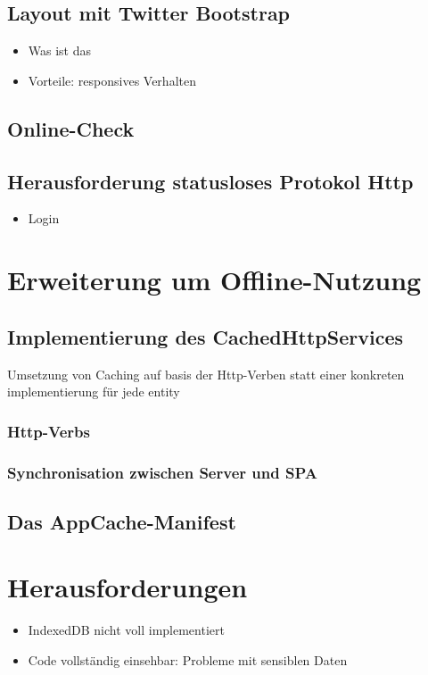 \subsection{Layout mit Twitter Bootstrap}
\label{ssec:SPA-twitter-bootstrap}

\begin{itemize}
\item Was ist das 
\item Vorteile: responsives Verhalten 
\end{itemize}

\subsection{Online-Check}
\label{ssec:Online-Check}

\subsection{Herausforderung statusloses Protokol Http}
\label{ssec:statusloses-http}

\begin{itemize}
\item Login
\end{itemize}

\section{Erweiterung um Offline-Nutzung}
\label{sec:CachedHttpService}

\subsection{Implementierung des CachedHttpServices}
\label{ssec:Exkurs-IndexedDB}
Umsetzung von Caching auf basis der Http-Verben statt einer konkreten implementierung für jede entity

\subsubsection*{Http-Verbs}
\label{sssec:Http-Verbs}

\subsubsection*{Synchronisation zwischen Server und SPA}
\label{ssec:Sync-SPA}

\subsection{Das AppCache-Manifest}
\label{ssec:appcache-manifest}

\section{Herausforderungen}
\label{sec:Herausforderungen-SPA}
\begin{itemize}
\item IndexedDB nicht voll implementiert
\item Code vollständig einsehbar: Probleme mit sensiblen Daten
\end{itemize}
